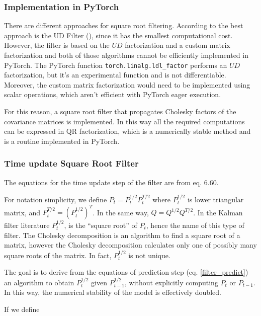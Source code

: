 \documentclass{article}
\begin{document}
\subsubsection{Implementation in PyTorch}

There are different approaches for square root filtering. According to \cite{mohinder_s_grewal_kalman_2001} the best approach is the UD Filter (\cite{bierman_numerical_1977}), since it has the smallest computational cost. However, the filter is based on the $UD$ factorization and a custom matrix factorization \cite{mohinder_s_grewal_kalman_2001} and both of those algorithms cannot be efficiently implemented in PyTorch. The PyTorch function \verb|torch.linalg.ldl_factor| performs an $UD$ factorization, but it's an experimental function and is not differentiable. Moreover, the custom matrix factorization would need to be implemented using scalar operations, which aren't efficient with PyTorch eager execution.

For this reason, a square root filter that propagates Cholesky factors of the covariance matrices is implemented. In this way all the required computations can be expressed in QR factorization, which is a numerically stable method and is a routine implemented in PyTorch.

\subsubsection{Time update Square Root Filter}

The equations for the time update step of the filter are from \cite{mohinder_s_grewal_kalman_2001} eq. 6.60.

For notation simplicity, we define $P_t=P_t^{1/2}P_t^{T/2}$ where $P_t^{1/2}$ is lower triangular matrix, and $P_t^{T/2} = (P_t^{1/2})^T$. In the same way, $Q=Q^{1/2}Q^{T/2}$. In the Kalman filter literature $P_t^{1/2}$, is the ``square root'' of $P_t$, hence the name of this type of filter. The Cholesky decomposition is an algorithm to find a square root of a matrix, however the Cholesky decomposition calculates only one of possibly many square roots of the matrix. In fact, $P_t^{1/2}$ is not unique.

The goal is to derive from the equations of prediction step (eq. \ref{filter_predict}) an algorithm to obtain $P_t^{1/2}$ given $P_{t-1}^{1/2}$, without explicitly computing $P_t$ or $P_{t-1}$. In this way, the numerical stability of the model is effectively doubled.

If we define
\end{document}
